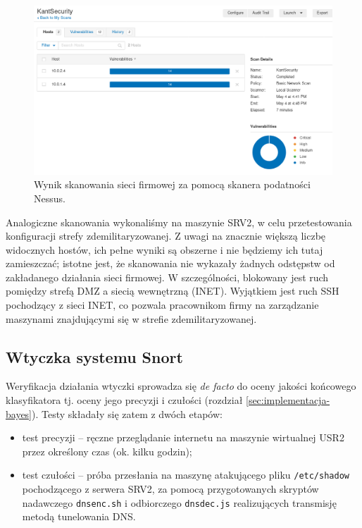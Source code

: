\documentclass{eiti-raport}
\begin{document}
\begin{figure}[!h] \centering
	\includegraphics[width=0.95\linewidth]{img/nessus.PNG}
	\caption{Wynik skanowania sieci firmowej za pomocą skanera podatności Nessus.} \label{fig:nessus}
\end{figure}

Analogiczne skanowania wykonaliśmy na maszynie SRV2, w celu przetestowania konfiguracji strefy zdemilitaryzowanej. Z uwagi na znacznie większą liczbę widocznych hostów, ich pełne wyniki są obszerne i nie będziemy ich tutaj zamieszczać; istotne jest, że skanowania nie wykazały żadnych odstępstw od zakładanego działania sieci firmowej. W szczególności, blokowany jest ruch pomiędzy strefą DMZ a siecią wewnętrzną (INET). Wyjątkiem jest ruch SSH pochodzący z sieci INET, co pozwala pracownikom firmy na zarządzanie maszynami znajdującymi się w strefie zdemilitaryzowanej.


\subsection{Wtyczka systemu Snort} \label{sec:testy-wtyczka}
Weryfikacja działania wtyczki sprowadza się \emph{de facto} do oceny jakości końcowego klasyfikatora tj. oceny jego precyzji i czułości (rozdział \ref{sec:implementacja-bayes}). Testy składały się zatem z dwóch etapów: \begin{itemize}
	\item test precyzji -- ręczne przeglądanie internetu na maszynie wirtualnej USR2 przez określony czas (ok. kilku godzin);
	\item test czułości -- próba przesłania na maszynę atakującego pliku \texttt{/etc/shadow} pochodzącego z serwera SRV2, za pomocą przygotowanych skryptów nadawczego \texttt{dnsenc.sh} i odbiorczego \texttt{dnsdec.js} realizujących transmisję metodą tunelowania DNS.
\end{itemize}
\end{document}
